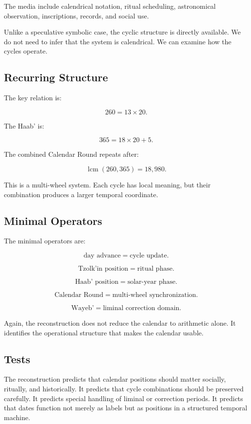 \documentclass[11pt]{book}
\begin{document}
The media include calendrical notation, ritual scheduling, astronomical observation, inscriptions, records, and social use.

Unlike a speculative symbolic case, the cyclic structure is directly available. We do not need to infer that the system is calendrical. We can examine how the cycles operate.

\subsection{Recurring Structure}

The key relation is:

\[
260 = 13 \times 20.
\]

The Haab' is:

\[
365 = 18 \times 20 + 5.
\]

The combined Calendar Round repeats after:

\[
\operatorname{lcm}(260,365)=18{,}980.
\]

This is a multi-wheel system. Each cycle has local meaning, but their combination produces a larger temporal coordinate.

\subsection{Minimal Operators}

The minimal operators are:

\[
\text{day advance} = \text{cycle update}.
\]

\[
\text{Tzolk'in position} = \text{ritual phase}.
\]

\[
\text{Haab' position} = \text{solar-year phase}.
\]

\[
\text{Calendar Round} = \text{multi-wheel synchronization}.
\]

\[
\text{Wayeb'} = \text{liminal correction domain}.
\]

Again, the reconstruction does not reduce the calendar to arithmetic alone. It identifies the operational structure that makes the calendar usable.

\subsection{Tests}

The reconstruction predicts that calendar positions should matter socially, ritually, and historically. It predicts that cycle combinations should be preserved carefully. It predicts special handling of liminal or correction periods. It predicts that dates function not merely as labels but as positions in a structured temporal machine.
\end{document}
